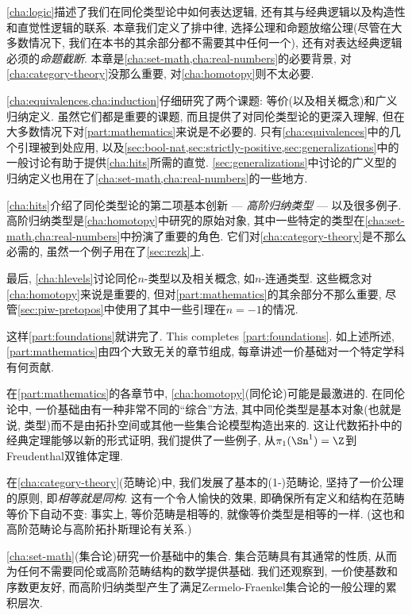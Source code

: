 \cref{cha:logic}描述了我们在同伦类型论中如何表达逻辑, 还有其与经典逻辑以及构造性和直觉性逻辑的联系. 
本章我们定义了排中律, 选择公理和命题放缩公理(尽管在大多数情况下, 我们在本书的其余部分都不需要其中任何一个), 还有对表达经典逻辑必须的\emph{命题截断}. 
本章是\cref{cha:set-math,cha:real-numbers}的必要背景, 对\cref{cha:category-theory}没那么重要, 对\cref{cha:homotopy}则不太必要. 

\cref{cha:equivalences,cha:induction}仔细研究了两个课题: 等价(以及相关概念)和广义归纳定义. 
虽然它们都是重要的课题, 而且提供了对同伦类型论的更深入理解, 但在大多数情况下对\cref{part:mathematics}来说是不必要的. 
只有\cref{cha:equivalences}中的几个引理被到处应用,  以及\cref{sec:bool-nat,sec:strictly-positive,sec:generalizations}中的一般讨论有助于提供\cref{cha:hits}所需的直觉. 
\cref{sec:generalizations}中讨论的广义型的归纳定义也用在了\cref{cha:set-math,cha:real-numbers}的一些地方. 

\cref{cha:hits}介绍了同伦类型论的第二项基本创新 --- \emph{高阶归纳类型} --- 以及很多例子. 
高阶归纳类型是\cref{cha:homotopy}中研究的原始对象, 其中一些特定的类型在\cref{cha:set-math,cha:real-numbers}中扮演了重要的角色. 
它们对\cref{cha:category-theory}是不那么必需的, 虽然一个例子用在了\cref{sec:rezk}上. 

最后, \cref{cha:hlevels}讨论同伦$n$-类型以及相关概念, 如$n$-连通类型. 
这些概念对\cref{cha:homotopy}来说是重要的, 但对\cref{part:mathematics}的其余部分不那么重要, 尽管\cref{sec:piw-pretopos}中使用了其中一些引理在$n=-1$的情况. 

这样\cref{part:foundations}就讲完了. 
This completes \cref{part:foundations}.
如上述所述, \cref{part:mathematics}由四个大致无关的章节组成, 每章讲述一价基础对一个特定学科有何贡献. 

在\cref{part:mathematics}的各章节中, \cref{cha:homotopy}(同伦论)可能是最激进的. 
在同伦论中, 一价基础由有一种非常不同的``综合''方法, 其中同伦类型是基本对象(也就是说, 类型)而不是由拓扑空间或其他一些集合论模型构造出来的. 
这让代数拓扑中的经典定理能够以新的形式证明, 我们提供了一些例子, 从$\pi_1(\Sn^1)=\Z$到Freudenthal双锥体定理. 

在\cref{cha:category-theory}(范畴论)中, 我们发展了基本的(1-)范畴论, 坚持了一价公理的原则, 即\emph{相等就是同构}. 
这有一个令人愉快的效果, 即确保所有定义和结构在范畴等价下自动不变: 事实上, 等价范畴是相等的, 就像等价类型是相等的一样. 
(这也和高阶范畴论与高阶拓扑斯理论有关系.) 

\cref{cha:set-math}(集合论)研究一价基础中的集合. 
集合范畴具有其通常的性质, 从而为任何不需要同伦或高阶范畴结构的数学提供基础. 
我们还观察到, 一价使基数和序数更友好, 而高阶归纳类型产生了满足Zermelo-Fraenkel集合论的一般公理的累积层次. 

